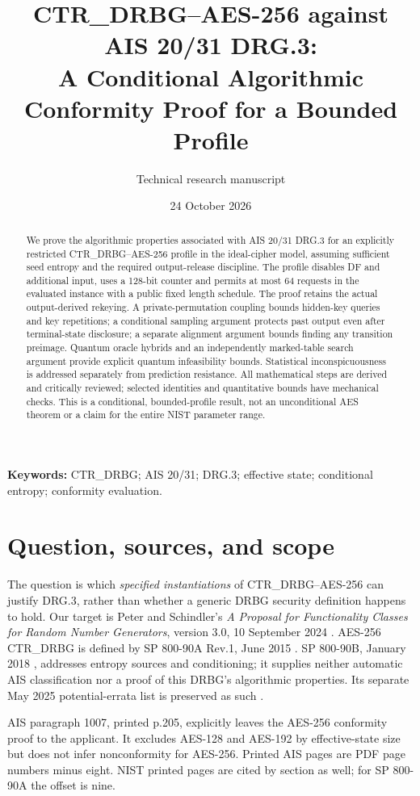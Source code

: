 \documentclass[11 pt,a 4 paper]{article}
\title{\sffamily CTR\_DRBG--AES-256 against AIS 20/31 DRG.3:\\A Conditional Algorithmic Conformity Proof for a Bounded Profile}
\author{Technical research manuscript}
\date{24 October 2026}
\begin{document}
\maketitle
\begin{abstract}
We prove the algorithmic properties associated with AIS 20/31 DRG.3 for an explicitly restricted CTR\_DRBG--AES-256 profile in the ideal-cipher model, assuming sufficient seed entropy and the required output-release discipline. The profile disables DF and additional input, uses a 128-bit counter and permits at most 64 requests in the evaluated instance with a public fixed length schedule. The proof retains the actual output-derived rekeying. A private-permutation coupling bounds hidden-key queries and key repetitions; a conditional sampling argument protects past output even after terminal-state disclosure; a separate alignment argument bounds finding any transition preimage. Quantum oracle hybrids and an independently marked-table search argument provide explicit quantum infeasibility bounds. Statistical inconspicuousness is addressed separately from prediction resistance. All mathematical steps are derived and critically reviewed; selected identities and quantitative bounds have mechanical checks. This is a conditional, bounded-profile result, not an unconditional AES theorem or a claim for the entire NIST parameter range.
\end{abstract}
\noindent\textbf{Keywords:} CTR\_DRBG; AIS 20/31; DRG.3; effective state; conditional entropy; conformity evaluation.

\section{Question, sources, and scope}
The question is which \emph{specified instantiations} of CTR\_DRBG--AES-256 can justify DRG.3, rather than whether a generic DRBG security definition happens to hold. Our target is Peter and Schindler's \emph{A Proposal for Functionality Classes for Random Number Generators}, version 3.0, 10 September 2024 \cite{ais}. AES-256 CTR\_DRBG is defined by SP 800-90A Rev.1, June 2015 \cite{90a}. SP 800-90B, January 2018 \cite{90b}, addresses entropy sources and conditioning; it supplies neither automatic AIS classification nor a proof of this DRBG's algorithmic properties. Its separate May 2025 potential-errata list is preserved as such \cite{errata}.

AIS paragraph 1007, printed p.205, explicitly leaves the AES-256 conformity proof to the applicant. It excludes AES-128 and AES-192 by effective-state size but does not infer nonconformity for AES-256. Printed AIS pages are PDF page numbers minus eight. NIST printed pages are cited by section as well; for SP 800-90A the offset is nine.
\end{document}
